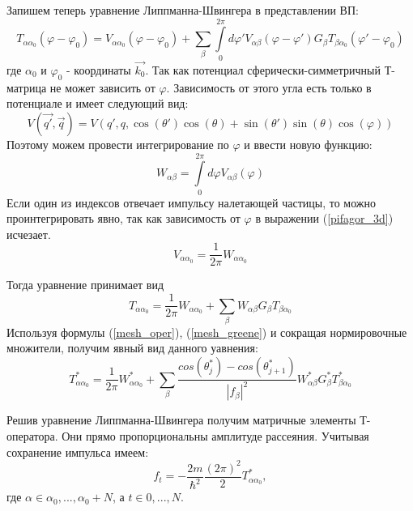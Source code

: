 \documentclass[a4paper,12pt]{article}
\begin{document}
Запишем теперь уравнение Липпманна-Швингера в представлении ВП:
\begin{equation}
 T_{\alpha\alpha_0}(\varphi-\varphi_0) = 
 V_{\alpha\alpha_0}(\varphi-\varphi_0) + 
 \sum\limits_\beta \int\limits_0^{2\pi} d \varphi' V_{\alpha\beta}(\varphi-\varphi') G_{\beta} T_{\beta\alpha_0}(\varphi'-\varphi_0)
\end{equation}
где $\alpha_0$ и $\varphi_0$ - координаты $\vec{k_0}$.  Так как потенциал сферически-симметричный Т-матрица не может зависить от $\varphi$. Зависимость от этого угла есть только в потенциале и имеет следующий вид:
\begin{equation}
\label{pifagor_3d}
    V(\vec{q'},\vec{q}) = V(q',q, \cos(\theta')\cos(\theta) + \sin(\theta')\sin(\theta)\cos(\varphi) )
\end{equation} 
Поэтому можем провести интегрирование по $\varphi$ и ввести новую функцию:
\begin{equation}
    \label{phi_int}
    W_{\alpha\beta} = \int\limits_{0}^{2\pi} d\varphi V_{\alpha\beta}(\varphi)
\end{equation}
Если один из индексов отвечает импульсу налетающей частицы, то можно проинтегрировать явно, так как зависимость от $\varphi$ в выражении (\ref{pifagor_3d}) исчезает.
\begin{equation}
    V_{\alpha\alpha_0} = \frac{1}{2\pi}W_{\alpha\alpha_0}
\end{equation}

Тогда уравнение принимает вид
\begin{equation}
    T_{\alpha\alpha_0} = \frac{1}{2\pi}W_{\alpha\alpha_0} + \sum\limits_\beta  W_{\alpha\beta} G_{\beta} T_{\beta\alpha_0}
\end{equation}
Используя формулы (\ref{mesh_oper}), (\ref{mesh_greene}) и сокращая нормировочные множители, получим явный вид данного уавнения:
\begin{equation}
    T^*_{\alpha\alpha_0} = \frac{1}{2\pi}W^*_{\alpha\alpha_0} +
 \sum\limits_\beta \frac{cos(\theta_j^*)-cos(\theta_{j+1}^*)}{|f_\beta|^2} W^*_{\alpha\beta} G^*_{\beta} T^*_{\beta\alpha_0}
\end{equation}

Решив уравнение Липпманна-Швингера получим матричные элементы Т-оператора. Они прямо пропорциональны амплитуде рассеяния. Учитывая сохранение импульса имеем:
\begin{equation}
    f_t = - \frac{2m}{\hbar^2} \frac{(2\pi)^2}{2} T^*_{\alpha\alpha_0},
\end{equation}
где $\alpha \in {\alpha_0, ... , \alpha_0 + N}$, а $t \in {0, ... ,N} $.
\end{document}
